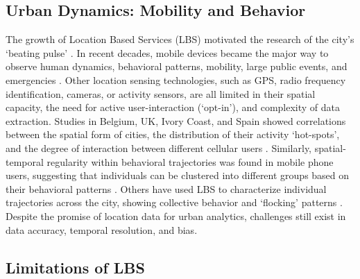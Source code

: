 {  \subsection{Urban Dynamics: Mobility and Behavior}\label{subsec:andorra-data-observatory-mobility}

  {
      The growth of Location Based Services (LBS) motivated the research of the city's `beating pulse' \cite{Becker2011}. In recent decades, mobile devices became the major way to observe human dynamics, behavioral patterns, mobility, large public events, and emergencies \cite{Blondel2015, Calabrese2014, Reades2007, gonzalez2008understanding, Deville2014, Berlingerio2013}. Other location sensing technologies, such as GPS, radio frequency identification, cameras, or activity sensors, are all limited in their spatial capacity, the need for active user-interaction (`opt-in'), and complexity of data extraction.
      \newline
      Studies in Belgium, UK, Ivory Coast, and Spain showed correlations between the spatial form of cities, the distribution of their activity `hot-spots', and the degree of interaction between different cellular users \cite{Blondel2015, Louail2014}. Similarly, spatial-temporal regularity within behavioral trajectories was found in mobile phone users, suggesting that individuals can be clustered into different groups based on their behavioral patterns \cite{Song2010}. Others have used LBS to characterize individual trajectories across the city, showing collective behavior and `flocking' patterns \cite{Ratti2006, DecodingtheCity}. Despite the promise of location data for urban analytics, challenges still exist in data accuracy, temporal resolution, and bias.
  }

  \subsection{Limitations of LBS}

}
